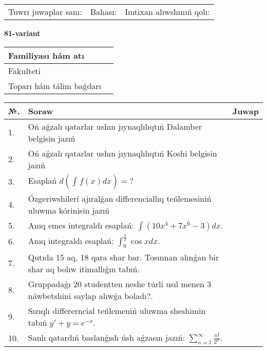 \documentclass{article}
\begin{document}
\vspace{1cm}

\begin{tabular}{ c c c }
Tuwrı juwaplar sanı: \underline{\hspace{2cm}} & Bahası: \underline{\hspace{2cm}} & Imtixan alıwshınıń qolı: \underline{\hspace{2cm}} \\
\end{tabular}

\newpage

\begin{center}\textbf{81-variant}\end{center}

\bgroup
\def\arraystretch{1.5}
\begin{tabular}{ |m{6cm}|m{10cm}| }
  \hline
  Familiyası hám atı & \\
  \hline
  Fakulteti &\\
  \hline
  Toparı hám tálim baǵdarı & \\
  \hline
\end{tabular}
\egroup

\vspace{0.5cm}

\bgroup
\def\arraystretch{2}
\begin{tabular}{ |l|m{8cm}|m{7cm}| }
  \hline
  №. & Soraw & Juwap \\
  \hline
  1. & Oń aǵzalı qatarlar ushın jıynaqlılıqtıń Dalamber belgisin jazıń &  \\
  \hline
  2. & Oń aǵzalı qatarlar ushın jıynaqlılıqtıń Koshi belgisin jazıń &  \\
  \hline
  3. & Esaplań $\displaystyle d\left( \int_{}^{}{f(x)dx} \right) = ?$ &  \\
  \hline
  4. & Ózgeriwshileri ajıralǵan differenciallıq teńlemesiniń uluwma kórinisin jazıń &  \\
  \hline
  5. & Anıq emes integraldı esaplań: $\displaystyle\int \left( 10x^{4} + 7x^{6} - 3 \right)dx$. &  \\
  \hline
  6. & Anıq integraldı esaplań: $\displaystyle\int_{0}^{\frac{\pi}{2}}\cos xdx$. &  \\
  \hline
  7. & Qutıda 15 aq, 18 qara shar bar. Tosınnan alınǵan bir shar aq bolıw itimallıǵın tabıń. &  \\
  \hline
  8. & Gruppadaǵı 20 studentten neshe túrli usıl menen 3 náwbetshini saylap alıwǵa boladı?. &  \\
  \hline
  9. & Sızıqlı differerncial teńlemeniń uluwma sheshimin tabıń $y' + y =e^{-x}$. &  \\
  \hline
  10. & Sanlı qatardıń baslanǵısh úsh aǵzasın jazıń: $\displaystyle\sum_{n = 1}^{\infty}\frac{n!}{2^{n}}$. &  \\
  \hline
\end{tabular}
\egroup
\end{document}
